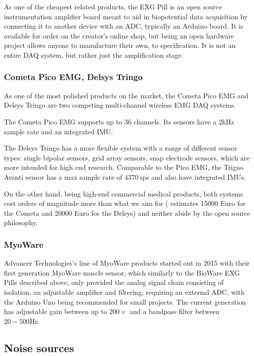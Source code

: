 \documentclass{thesis}
\newcommand{\Hz}{\unit{\hertz}}
\newcommand{\kHz}{\unit{\kilo\hertz}}
\begin{document}
As one of the cheapest related products, the EXG Pill is an open source instrumentation amplifier board meant to aid in biopotential data acquisition by connecting it to another device with an ADC, typically an Arduino board. It is available for order on the creator's online shop, but being an open hardware project allows anyone to manufacture their own, to specification. It is not an entire DAQ system, but rather just the amplification stage.

\subsubsection*{Cometa Pico EMG, Delsys Tringo}

As one of the most polished products on the market, the Cometa Pico EMG and Delsys Tringo are two competing multi-channel wireless EMG DAQ systems.

The Cometa Pico EMG supports up to 36 channels. Its sensors have a $2\kHz$ sample rate and an integrated IMU.\cite{cometapicoemg}

The Delsys Tringo has a more flexible system with a range of different sensor types: single bipolar sensors, grid array sensors, snap electrode sensors, which are more intended for high end research. Comparable to the Pico EMG, the Trigno Avanti sensor has a max sample rate of $4370\ \text{sps}$ and also have integrated IMUs.\cite{delsysemg}

On the other hand, being high-end commercial medical products, both systems cost orders of magnitude more than what we aim for (\cite{delToro2019} estimates 15000 Euro for the Cometa and 20000 Euro for the Delsys) and neither abide by the open source philosophy.

\subsubsection*{MyoWare}

Advancer Technologies's line of MyoWare products started out in 2015 with their first generation MyoWare muscle sensor, which similarly to the BioWare EXG Pills described above, only provided the analog signal chain consisting of isolation, an adjustable amplifier and filtering, requiring an external ADC, with the Arduino Uno being recommended for small projects. The current generation has adjustable gain between up to $200\times$ and a bandpass filter between $20-500\Hz$.\cite{myoware}

\subsection{Noise sources}
\end{document}
